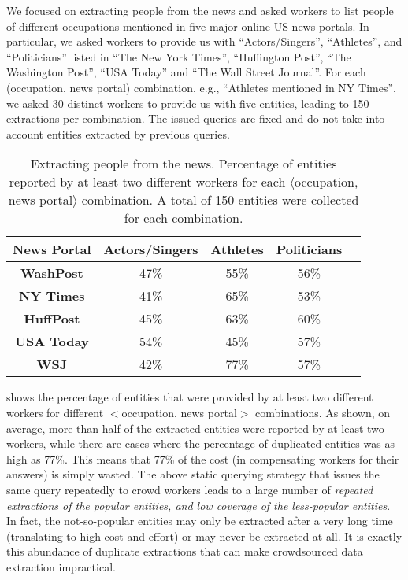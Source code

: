 \begin{example}
We focused on extracting people from the news and asked workers to list people of different occupations mentioned in five major online US news portals. 
In particular, we asked workers to provide us with ``Actors/Singers'', ``Athletes'', and ``Politicians'' 
listed in ``The New York Times'',  ``Huffington Post'', ``The Washington Post'', ``USA  Today'' and 
``The Wall Street Journal''. For each (occupation, news portal) combination, e.g., ``Athletes mentioned in NY Times'', 
we asked 30 distinct workers to provide us with five entities, leading to 150 extractions per combination. The issued queries are fixed and do not take into account entities extracted by previous queries.
\end{example}
\begin{table}[h]
\center
\caption{Extracting people from the news. Percentage of entities reported by at least two different workers for each $\langle$occupation, news portal$\rangle$ combination. A total of 150 entities were collected for each combination.}
\label{tab:duplicates}
\begin{tabular}{|c|c|c|c|c|}
\hline
News Portal & {\bf Actors/Singer}s & {\bf Athletes} & \textbf{Politicians}\\ \hline
{\bf WashPost} & 47\% & 55\% & 56\% \\
{\bf NY Times} & 41\%& 65\% & 53\% \\
{\bf HuffPost} & 45\% & 63\% & 60\% \\
{\bf USA Today} & 54\% & 45\% & 57\% \\
{\bf WSJ} & 42\% & 77\% & 57\% \\
\hline
\end{tabular}
\end{table}

 shows the percentage of entities that were provided by at least two different workers for different $<$occupation, news portal$>$ combinations. As shown, on average, more than half of the extracted entities were reported by at least two workers, while there are cases where the percentage of duplicated entities was as high as 77\%. This means that 77\% of the cost (in compensating workers for their answers) is simply wasted. The above static querying strategy that issues the same query repeatedly to crowd workers leads to a large number of {\em repeated extractions of the popular entities, and low coverage of the less-popular entities}. In fact, the not-so-popular entities may only be extracted after a very long time (translating to high cost and effort) or may never be extracted at all. It is exactly this abundance of duplicate extractions that can make crowdsourced data extraction impractical.

